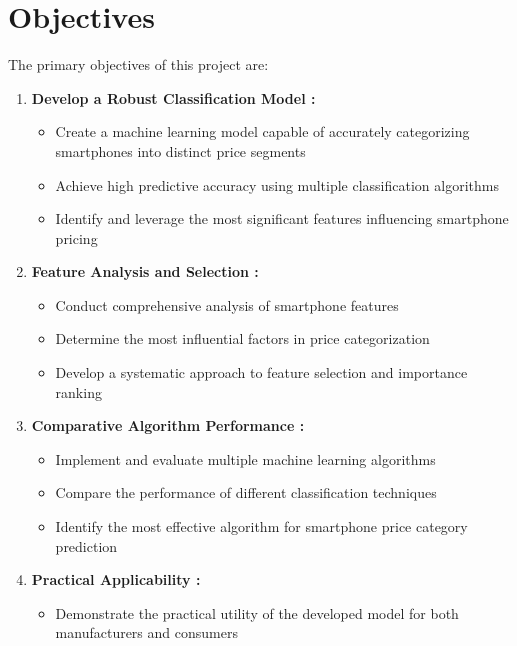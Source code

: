 \documentclass[12pt]{report}
\begin{document}
\section{Objectives}
The primary objectives of this project are:
\vspace{-1.25em}
\begin{enumerate}
	\setlength\itemsep{-1.05em}
	\item{\textbf{Develop a Robust Classification Model :}}
		\vspace{-1.65em}
		\begin{itemize}
			\setlength\itemsep{-1.5em}
			\item Create a machine learning model capable of accurately categorizing smartphones into distinct price segments
			\item Achieve high predictive accuracy using multiple classification algorithms
			\item Identify and leverage the most significant features influencing smartphone pricing
		\end{itemize}
	\item{\textbf{Feature Analysis and Selection :}}
		\vspace{-1.65em}
		\begin{itemize}
			\setlength\itemsep{-1.5em}
			\item Conduct comprehensive analysis of smartphone features
			\item Determine the most influential factors in price categorization
			\item Develop a systematic approach to feature selection and importance ranking
		\end{itemize}
	\item{\textbf{Comparative Algorithm Performance :}}
		\vspace{-1.65em}
		\begin{itemize}
			\setlength\itemsep{-1.5em}
			\item Implement and evaluate multiple machine learning algorithms
			\item Compare the performance of different classification techniques
			\item Identify the most effective algorithm for smartphone price category prediction
		\end{itemize}
	\item{\textbf{Practical Applicability :}}
		\vspace{-1.65em}
		\begin{itemize}
			\setlength\itemsep{-1.5em}
			\item Demonstrate the practical utility of the developed model for both manufacturers and consumers

\end{itemize}
\end{enumerate}
\end{document}
